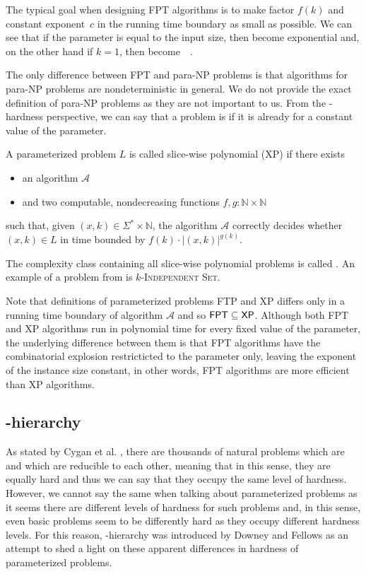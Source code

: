 The typical goal when designing FPT algorithms is to make factor $f(k)$ and constant exponent~$c$
in the running time boundary as small as possible.
We can see that if the parameter is equal to the input size, then \FPT become exponential and,
on the other hand if $k = 1$, then \FPT become~\Po~\cite{Koutensky2020}.

The only difference between FPT and para-NP problems is that algorithms for para-NP problems are
nondeterministic in general.
We do not provide the exact definition of para-NP problems as they are not important to us.
From the \pNP-hardness perspective, we can say that a problem is \pNPh if it is \NPh already for a constant value of the parameter.

\begin{definition}[XP]
    A parameterized problem $L$ is called slice-wise polynomial (XP) if there exists
    \begin{itemize}
        \item an algorithm $\mathcal{A}$
        \item and two computable, nondecreasing functions $f,g : \mathbb{N} \times \mathbb{N}$
    \end{itemize}
    such that, given $(x,k) \in \Sigma^* \times \mathbb{N}$,
    the algorithm $\mathcal{A}$ correctly decides whether $(x, k) \in L$ in time bounded by
    $f(k) \cdot |(x,k)|^{g(k)}$.
\end{definition}

The complexity class containing all slice-wise polynomial problems is called \XP.
An example of a problem from \XP is $k$-\textsc{Independent Set}.

Note that definitions of parameterized problems FTP and XP differs only in a running time boundary of algorithm $\mathcal{A}$
and so $\textsf{FPT} \subseteq \textsf{XP}$.
Although both FPT and XP algorithms run in polynomial time for every fixed value of the parameter,
the underlying difference between them is that FPT algorithms have the combinatorial explosion
restricticted to the parameter only, leaving the exponent of the instance size constant, in other words,
FPT algorithms are more efficient than XP algorithms.


\subsection{\W-hierarchy}

As stated by Cygan et al. \cite[p.~423]{Cygan2015},
there are thousands of natural problems which are \NPc and which are reducible to each other,
meaning that in this sense, they are equally hard and thus we can say that
they occupy the same level of hardness.
However, we cannot say the same when talking about parameterized problems as it seems there are
different levels of hardness for such problems and, in this sense, even basic problems
seem to be differently hard as they occupy different hardness levels.
For this reason, \W-hierarchy was introduced by Downey and Fellows \cite{Downey1999} as
an attempt to shed a light on these apparent differences in hardness of parameterized problems. 

